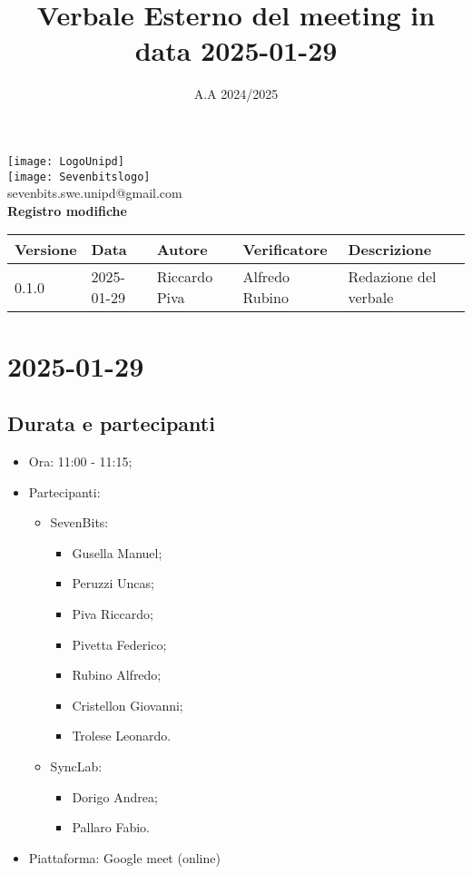 \documentclass[10pt]{article}
\title{Verbale Esterno del meeting in data 2025-01-29}
\date{A.A 2024/2025}
\begin{document}
\maketitle
\begin{center}
\texttt{[image: LogoUnipd]}\\
\texttt{[image: Sevenbitslogo]}\\
sevenbits.swe.unipd@gmail.com\\
\vspace{2mm}
\textbf{Registro modifiche}\\
\vspace{2mm}
\begin{tabularx}{\textwidth}{|l|l|l|l|X|}
\hline
\textbf{Versione} & \textbf{Data} & \textbf{Autore} & \textbf{Verificatore} & \textbf{Descrizione} \\
\hline
0.1.0 & 2025-01-29 & Riccardo Piva & Alfredo Rubino & Redazione del verbale \\
\hline
\end{tabularx}
\end{center}
\newpage
\tableofcontents
\newpage
\section{2025-01-29}
\subsection{Durata e partecipanti}
\begin{itemize}
\item Ora: 11:00 - 11:15;
\item Partecipanti:
	\begin{itemize}
	\item 	SevenBits:
			\begin{itemize}
				\item Gusella Manuel;
				\item Peruzzi Uncas;
				\item Piva Riccardo;
				\item Pivetta Federico;
				\item Rubino Alfredo;
				\item Cristellon Giovanni;
				\item Trolese Leonardo.
			\end{itemize}
	\item 	SyncLab:
			\begin{itemize}
				\item Dorigo Andrea;
				\item Pallaro Fabio.
			\end{itemize}
	\end{itemize}
\item Piattaforma: Google meet (online)
\end{itemize}
\end{document}
